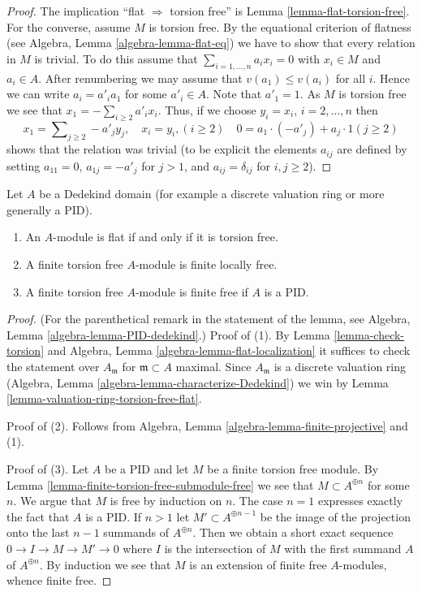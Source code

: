 \begin{proof}
The implication ``flat $\Rightarrow$ torsion free'' is
Lemma \ref{lemma-flat-torsion-free}.
For the converse, assume $M$ is torsion free.
By the equational criterion of flatness (see
Algebra, Lemma \ref{algebra-lemma-flat-eq})
we have to show that every relation in $M$ is trivial. To do this assume that
$\sum_{i = 1, \ldots, n} a_i x_i = 0$ with $x_i \in M$ and $a_i \in A$.
After renumbering we may assume that $v(a_1) \leq v(a_i)$ for all $i$.
Hence we can write $a_i = a'_i a_1$ for some $a'_i \in A$. Note that
$a'_1 = 1$. As $M$ is torsion free we see that
$x_1 = - \sum_{i \geq 2} a'_i x_i$. Thus, if we choose
$y_i = x_i$, $i = 2, \ldots, n$ then
$$
x_1 = \sum\nolimits_{j \geq 2} -a'_j y_j, \quad
x_i = y_i, (i \geq 2)\quad
0 = a_1 \cdot (-a'_j) + a_j \cdot 1 (j \geq 2)
$$
shows that the relation was trivial (to be explicit the elements
$a_{ij}$ are defined by setting $a_{11} = 0$, $a_{1j} = -a'_j$
for $j > 1$, and $a_{ij} = \delta_{ij}$ for $i, j \geq 2$).
\end{proof}

\begin{lemma}
\label{lemma-dedekind-torsion-free-flat}
Let $A$ be a Dedekind domain (for example a discrete valuation ring
or more generally a PID).
\begin{enumerate}
\item An $A$-module is flat if and only if it is torsion free.
\item A finite torsion free $A$-module is finite locally free.
\item A finite torsion free $A$-module is finite free if
$A$ is a PID.
\end{enumerate}
\end{lemma}

\begin{proof}
(For the parenthetical remark in the statement of the lemma, see
Algebra, Lemma \ref{algebra-lemma-PID-dedekind}.) Proof of (1).
By Lemma \ref{lemma-check-torsion}
and Algebra, Lemma \ref{algebra-lemma-flat-localization}
it suffices to check the statement over $A_\mathfrak m$
for $\mathfrak m \subset A$ maximal. Since $A_\mathfrak m$
is a discrete valuation ring
(Algebra, Lemma \ref{algebra-lemma-characterize-Dedekind})
we win by Lemma \ref{lemma-valuation-ring-torsion-free-flat}.

\medskip\noindent
Proof of (2). Follows from
Algebra, Lemma \ref{algebra-lemma-finite-projective}
and (1).

\medskip\noindent
Proof of (3). Let $A$ be a PID and let $M$ be a finite
torsion free module. By Lemma \ref{lemma-finite-torsion-free-submodule-free}
we see that $M \subset A^{\oplus n}$ for some $n$. We argue that
$M$ is free by induction on $n$. The case $n = 1$ expresses exactly the
fact that $A$ is a PID. If $n > 1$ let $M' \subset A^{\oplus n - 1}$
be the image of the projection onto the last $n - 1$ summands of
$A^{\oplus n}$. Then we obtain a short exact sequence
$0 \to I \to M \to M' \to 0$ where $I$ is the intersection of $M$
with the first summand $A$ of $A^{\oplus n}$. By induction we
see that $M$ is an extension of finite free $A$-modules, whence
finite free.
\end{proof}

